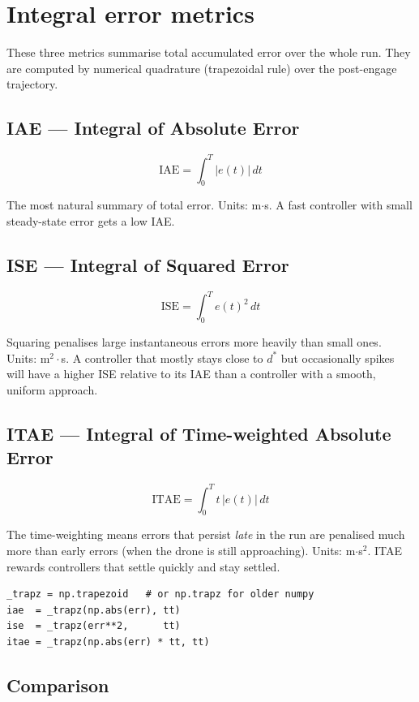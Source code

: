 \documentclass[11pt,a4paper]{article}
\begin{document}
\section{Integral error metrics}

These three metrics summarise total accumulated error over the whole run.
They are computed by numerical quadrature (trapezoidal rule) over the
post-engage trajectory.

\subsection{IAE --- Integral of Absolute Error}

\[
  \mathrm{IAE} = \int_0^T |e(t)|\, dt
\]

The most natural summary of total error.  Units: m$\cdot$s.
A fast controller with small steady-state error gets a low IAE.

\subsection{ISE --- Integral of Squared Error}

\[
  \mathrm{ISE} = \int_0^T e(t)^2\, dt
\]

Squaring penalises large instantaneous errors more heavily than small ones.
Units: m$^2\cdot$s.
A controller that mostly stays close to $d^*$ but occasionally spikes will have
a higher ISE relative to its IAE than a controller with a smooth, uniform
approach.

\subsection{ITAE --- Integral of Time-weighted Absolute Error}

\[
  \mathrm{ITAE} = \int_0^T t\,|e(t)|\, dt
\]

The time-weighting means errors that persist \emph{late} in the run are
penalised much more than early errors (when the drone is still approaching).
Units: m$\cdot$s$^2$.
ITAE rewards controllers that settle quickly and stay settled.

\begin{lstlisting}
_trapz = np.trapezoid   # or np.trapz for older numpy
iae  = _trapz(np.abs(err), tt)
ise  = _trapz(err**2,      tt)
itae = _trapz(np.abs(err) * tt, tt)
\end{lstlisting}

\subsection*{Comparison}
\end{document}
